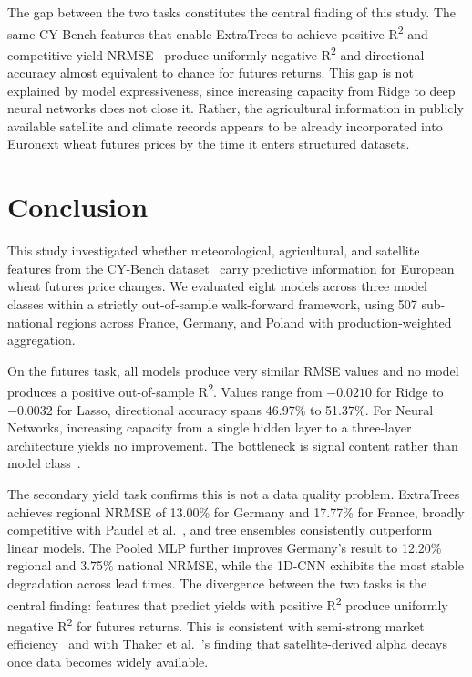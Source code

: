 \documentclass[pdflatex,sn-mathphys-num, oneside, 11pt]{sn-jnl}%
\theoremstyle{thmstyleone}%
\theoremstyle{thmstyletwo}%
\theoremstyle{thmstylethree}%
\begin{document}
The gap between the two tasks constitutes the central finding of this study. The same CY-Bench features that enable ExtraTrees to achieve positive R\textsuperscript{2} and competitive yield NRMSE~\cite{bib16} produce uniformly negative R\textsuperscript{2} and directional accuracy almost equivalent to chance for futures returns. This gap is not explained by model expressiveness, since increasing capacity from Ridge to deep neural networks does not close it. Rather, the agricultural information in publicly available satellite and climate records appears to be already incorporated into Euronext wheat futures prices by the time it enters structured datasets.

\section{Conclusion}\label{conclusion}

This study investigated whether meteorological, agricultural, and satellite features from the CY-Bench dataset~\cite{bib17} carry predictive information for European wheat futures price changes. We evaluated eight models across three model classes within a strictly out-of-sample walk-forward framework, using 507 sub-national regions across France, Germany, and Poland with production-weighted aggregation.

On the futures task, all models produce very similar RMSE values and no model produces a positive out-of-sample R\textsuperscript{2}. Values range from $-0.0210$ for Ridge to $-0.0032$ for Lasso, directional accuracy spans 46.97\% to 51.37\%. For Neural Networks, increasing capacity from a single hidden layer to a three-layer architecture yields no improvement. The bottleneck is signal content rather than model class~\cite{bib_goodfellow}.

The secondary yield task confirms this is not a data quality problem. ExtraTrees achieves regional NRMSE of 13.00\% for Germany and 17.77\% for France, broadly competitive with Paudel et al.~\cite{bib16}, and tree ensembles consistently outperform linear models. The Pooled MLP further improves Germany's result to 12.20\% regional and 3.75\% national NRMSE, while the 1D-CNN exhibits the most stable degradation across lead times. The divergence between the two tasks is the central finding: features that predict yields with positive R\textsuperscript{2} produce uniformly negative R\textsuperscript{2} for futures returns. This is consistent with semi-strong market efficiency~\cite{bib30} and with Thaker et al.~\cite{bib19}'s finding that satellite-derived alpha decays once data becomes widely available.
\end{document}
